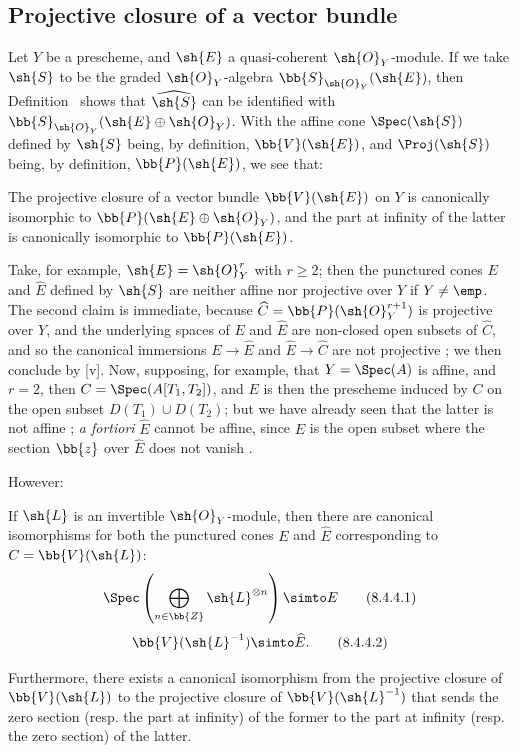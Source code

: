\subsection{Projective closure of a vector bundle}
\label{subsection:II.8.4}

\begin{env}[8.4.1]
\label{II.8.4.1}
Let $Y$ be a prescheme, and $\sh{E}$ a quasi-coherent $\sh{O}_Y$-module.
If we take $\sh{S}$ to be the graded $\sh{O}_Y$-algebra $\bb{S}_{\sh{O}_Y}(\sh{E})$, then Definition~ shows that $\widehat{\sh{S}}$ can be identified with $\bb{S}_{\sh{O}_Y}(\sh{E}\oplus\sh{O}_Y)$.
With the affine cone $\Spec(\sh{S})$ defined by $\sh{S}$ being, by definition, $\bb{V}(\sh{E})$, and $\Proj(\sh{S})$ being, by definition, $\bb{P}(\sh{E})$, we see that:
\end{env}
\begin{proposition}[8.4.2]
\label{II.8.4.2}
The projective closure of a vector bundle $\bb{V}(\sh{E})$ on $Y$ is canonically isomorphic to $\bb{P}(\sh{E}\oplus\sh{O}_Y)$, and the part at infinity of the latter is canonically isomorphic to $\bb{P}(\sh{E})$.
\end{proposition}

\begin{remark}[8.4.3]
\label{II.8.4.3}
Take, for example, $\sh{E}=\sh{O}_Y^r$ with $r\geq2$;
then the punctured cones $E$ and $\widehat{E}$ defined by $\sh{S}$ are neither affine nor projective over $Y$ if $Y\neq\emp$.
The second claim is immediate, because $\widehat{C}=\bb{P}(\sh{O}_Y^{r+1})$ is projective over $Y$, and the underlying spaces of $E$ and $\widehat{E}$ are non-closed open subsets of $\widehat{C}$, and so the canonical immersions $E\to\widehat{E}$ and $\widehat{E}\to\widehat{C}$ are not projective ; we then conclude by [v].
Now, supposing, for example, that $Y=\Spec(A)$ is affine, and $r=2$, then $C=\Spec(A[T_1,T_2])$, and $E$ is then the prescheme induced by $C$ on the open subset $D(T_1)\cup D(T_2)$;
but we have already seen that the latter is not affine ;
\emph{a fortiori} $\widehat{E}$ cannot be affine, since $E$ is the open subset where the section $\bb{z}$ over $\widehat{E}$ does not vanish .

However:
\end{remark}
\begin{proposition}[8.4.4]
\label{II.8.4.4}
If $\sh{L}$ is an invertible $\sh{O}_Y$-module, then there are canonical isomorphisms for both the punctured cones $E$ and $\widehat{E}$ corresponding to $C=\bb{V}(\sh{L})$:
\[
\label{eq:2.8.4.4.1}
  \Spec\left(
    \bigoplus_{n\in\bb{Z}}\sh{L}^{\otimes n}
  \right)
  \simto
  E
\tag{8.4.4.1}
\]
\[
\label{eq:2.8.4.4.2}
  \bb{V}(\sh{L}^{-1})
  \simto
  \widehat{E}.
\tag{8.4.4.2}
\]

Furthermore, there exists a canonical isomorphism from the projective closure of $\bb{V}(\sh{L})$ to the projective closure of $\bb{V}(\sh{L}^{-1})$ that sends the zero section (resp. the part at infinity) of the former to the part at infinity (resp. the zero section) of the latter.
\end{proposition}

